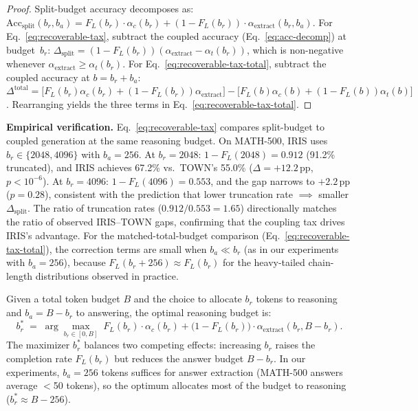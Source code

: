 \begin{proof}
Split-budget accuracy decomposes as:
$\mathrm{Acc}_{\mathrm{split}}(b_r, b_a)
= F_L(b_r) \cdot \alpha_c(b_r)
+ (1 - F_L(b_r)) \cdot \alpha_{\mathrm{extract}}(b_r, b_a)$.
For Eq.~\eqref{eq:recoverable-tax}, subtract the coupled accuracy
(Eq.~\ref{eq:acc-decomp}) at budget~$b_r$:
$\Delta_{\mathrm{split}}
= (1 - F_L(b_r))(\alpha_{\mathrm{extract}} - \alpha_t(b_r))$,
which is non-negative whenever $\alpha_{\mathrm{extract}} \ge \alpha_t(b_r)$.
For Eq.~\eqref{eq:recoverable-tax-total}, subtract the coupled
accuracy at $b = b_r + b_a$:
$\Delta^{\mathrm{total}}
= \bigl[F_L(b_r) \alpha_c(b_r) + (1{-}F_L(b_r))\alpha_{\mathrm{extract}}\bigr]
  - \bigl[F_L(b) \alpha_c(b) + (1{-}F_L(b))\alpha_t(b)\bigr]$.
Rearranging yields the three terms in Eq.~\eqref{eq:recoverable-tax-total}.
\end{proof}

\noindent
\textbf{Empirical verification.}
Eq.~\eqref{eq:recoverable-tax} compares split-budget to coupled generation
at the same reasoning budget.
On MATH-500, IRIS uses $b_r \in \{2048, 4096\}$ with $b_a = 256$.
At $b_r{=}2048$: $1 - F_L(2048) = 0.912$ (91.2\% truncated), and IRIS
achieves 67.2\% vs.\ TOWN's 55.0\% ($\Delta = +12.2$\,pp, $p < 10^{-6}$).
At $b_r{=}4096$: $1 - F_L(4096) = 0.553$, and the gap narrows to
$+2.2$\,pp ($p = 0.28$), consistent with the prediction that lower
truncation rate $\implies$ smaller $\Delta_{\mathrm{split}}$.
The ratio of truncation rates ($0.912/0.553 = 1.65$) directionally matches
the ratio of observed IRIS--TOWN gaps, confirming that the coupling tax
drives IRIS's advantage.
For the matched-total-budget comparison (Eq.~\ref{eq:recoverable-tax-total}),
the correction terms are small
when $b_a \ll b_r$ (as in our experiments with $b_a = 256$), because
$F_L(b_r + 256) \approx F_L(b_r)$ for the heavy-tailed chain-length
distributions observed in practice.

\begin{proposition}
\label{prop:optimal-split}
Given a total token budget $B$ and the choice to allocate
$b_r$ tokens to reasoning and $b_a = B - b_r$ to answering,
the optimal reasoning budget is:
\begin{equation}
  b_r^* \;=\; \arg\max_{b_r \in [0, B]} \;
  F_L(b_r) \cdot \alpha_c(b_r)
  + \bigl(1 - F_L(b_r)\bigr) \cdot
    \alpha_{\mathrm{extract}}(b_r, B - b_r).
  \label{eq:optimal-split}
\end{equation}
The maximizer $b_r^*$ balances two competing effects:
increasing $b_r$ raises the completion rate $F_L(b_r)$ but reduces
the answer budget $B - b_r$.
In our experiments, $b_a = 256$ tokens suffices for answer extraction
(MATH-500 answers average $<$50 tokens), so the optimum allocates
most of the budget to reasoning ($b_r^* \approx B - 256$).
\end{proposition}

